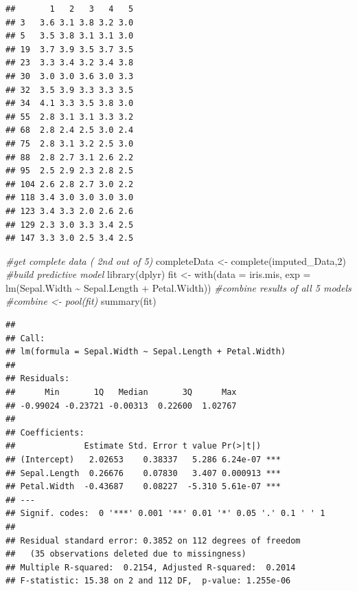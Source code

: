\documentclass[
]{book}
\newenvironment{Shaded}{\begin{snugshade}}{\end{snugshade}}
\newcommand{\AttributeTok}[1]{\textcolor[rgb]{0.77,0.63,0.00}{#1}}
\newcommand{\CommentTok}[1]{\textcolor[rgb]{0.56,0.35,0.01}{\textit{#1}}}
\newcommand{\DecValTok}[1]{\textcolor[rgb]{0.00,0.00,0.81}{#1}}
\newcommand{\FunctionTok}[1]{\textcolor[rgb]{0.00,0.00,0.00}{#1}}
\newcommand{\NormalTok}[1]{#1}
\newcommand{\OtherTok}[1]{\textcolor[rgb]{0.56,0.35,0.01}{#1}}
\newcommand{\SpecialCharTok}[1]{\textcolor[rgb]{0.00,0.00,0.00}{#1}}
\begin{document}
\begin{Shaded}
\end{Shaded}

\begin{verbatim}
##       1   2   3   4   5
## 3   3.6 3.1 3.8 3.2 3.0
## 5   3.5 3.8 3.1 3.1 3.0
## 19  3.7 3.9 3.5 3.7 3.5
## 23  3.3 3.4 3.2 3.4 3.8
## 30  3.0 3.0 3.6 3.0 3.3
## 32  3.5 3.9 3.3 3.3 3.5
## 34  4.1 3.3 3.5 3.8 3.0
## 55  2.8 3.1 3.1 3.3 3.2
## 68  2.8 2.4 2.5 3.0 2.4
## 75  2.8 3.1 3.2 2.5 3.0
## 88  2.8 2.7 3.1 2.6 2.2
## 95  2.5 2.9 2.3 2.8 2.5
## 104 2.6 2.8 2.7 3.0 2.2
## 118 3.4 3.0 3.0 3.0 3.0
## 123 3.4 3.3 2.0 2.6 2.6
## 129 2.3 3.0 3.3 3.4 2.5
## 147 3.3 3.0 2.5 3.4 2.5
\end{verbatim}

\begin{Shaded}
\begin{Highlighting}[]
\CommentTok{\#get complete data ( 2nd out of 5)}
\NormalTok{completeData }\OtherTok{\textless{}{-}} \FunctionTok{complete}\NormalTok{(imputed\_Data,}\DecValTok{2}\NormalTok{)}
\CommentTok{\#build predictive model}
\FunctionTok{library}\NormalTok{(dplyr)}
\NormalTok{fit }\OtherTok{\textless{}{-}} \FunctionTok{with}\NormalTok{(}\AttributeTok{data =}\NormalTok{ iris.mis, }\AttributeTok{exp =} \FunctionTok{lm}\NormalTok{(Sepal.Width }\SpecialCharTok{\textasciitilde{}}\NormalTok{ Sepal.Length }\SpecialCharTok{+}\NormalTok{ Petal.Width))}
\CommentTok{\#combine results of all 5 models}
\CommentTok{\#combine \textless{}{-} pool(fit)}
\FunctionTok{summary}\NormalTok{(fit)}
\end{Highlighting}
\end{Shaded}

\begin{verbatim}
## 
## Call:
## lm(formula = Sepal.Width ~ Sepal.Length + Petal.Width)
## 
## Residuals:
##      Min       1Q   Median       3Q      Max 
## -0.99024 -0.23721 -0.00313  0.22600  1.02767 
## 
## Coefficients:
##              Estimate Std. Error t value Pr(>|t|)    
## (Intercept)   2.02653    0.38337   5.286 6.24e-07 ***
## Sepal.Length  0.26676    0.07830   3.407 0.000913 ***
## Petal.Width  -0.43687    0.08227  -5.310 5.61e-07 ***
## ---
## Signif. codes:  0 '***' 0.001 '**' 0.01 '*' 0.05 '.' 0.1 ' ' 1
## 
## Residual standard error: 0.3852 on 112 degrees of freedom
##   (35 observations deleted due to missingness)
## Multiple R-squared:  0.2154, Adjusted R-squared:  0.2014 
## F-statistic: 15.38 on 2 and 112 DF,  p-value: 1.255e-06
\end{verbatim}
\end{document}
